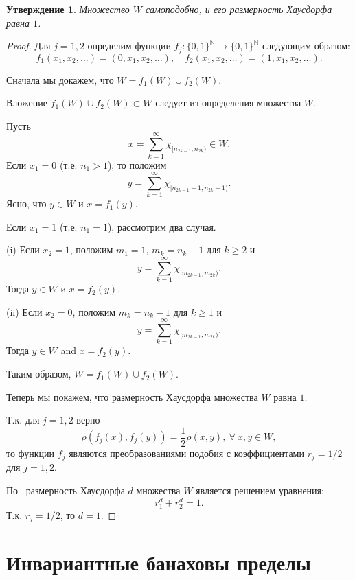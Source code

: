 \documentclass[12pt]{article}
\newtheorem{prop}[thm]{Утверждение}
\def\N{{\mathbb{N}}}
\begin{document}
\begin{prop}
Множество $W$ самоподобно, и его размерность Хаусдорфа равна $1$.
\end{prop}

\begin{proof}
Для $j=1,2$ определим функции $f_j : \{0,1\}^\N \to \{0,1\}^\N$ следующим образом:
$$f_1(x_1, x_2, \dots)=(0, x_1, x_2, \dots), \quad f_2(x_1, x_2, \dots)=(1, x_1, x_2, \dots).$$

Сначала мы докажем, что $W=f_1(W)\cup f_2(W).$

Вложение $f_1(W)\cup f_2(W) \subset W$ следует из определения множества $W$.

Пусть
$$x=\sum_{k=1}^\infty \chi_{[n_{2k-1},n_{2k})}\in W.$$
 Если $x_1=0$ (т.е. $n_1>1$), то положим
 $$y=\sum_{k=1}^\infty \chi_{[n_{2k-1}-1,n_{2k}-1)}.$$
 Ясно, что $y\in W$ и $x=f_1(y)$.

 Если $x_1=1$ (т.е. $n_1=1$), рассмотрим два случая.

 (i) Если $x_2=1$, положим $m_1=1$, $m_k=n_k-1$ для $k\ge2$ и
 $$y=\sum_{k=1}^\infty \chi_{[m_{2k-1},m_{2k})}.$$
 Тогда $y\in W$ и $x=f_2(y)$.

 (ii) Если $x_2=0$, положим $m_k=n_k-1$ для $k\ge1$ и
 $$y=\sum_{k=1}^\infty \chi_{[m_{2k-1},m_{2k})}.$$
 Тогда $y\in W$ and $x=f_2(y)$.

 Таким образом, $W=f_1(W)\cup f_2(W).$

 Теперь мы покажем, что размерность Хаусдорфа множества $W$ равна $1$.

Т.к. для $j=1,2$ верно
 $$\rho(f_j(x),f_j(y))=\frac12\rho(x,y), \ \forall \ x, y \in W,$$
 то функции $f_j$ являются преобразованиями подобия с коэффициентами $r_j=1/2$ для $j=1,2$.


По~\cite[Теорема 9.3]{Edgar} размерность Хаусдорфа $d$ множества $W$ является решением уравнения:
$$ r_1^d+r_2^d=1.$$
Т.к. $r_j=1/2$, то
$d=1.$
\end{proof}

\section{Инвариантные банаховы пределы}\label{sec:inv}
\end{document}
